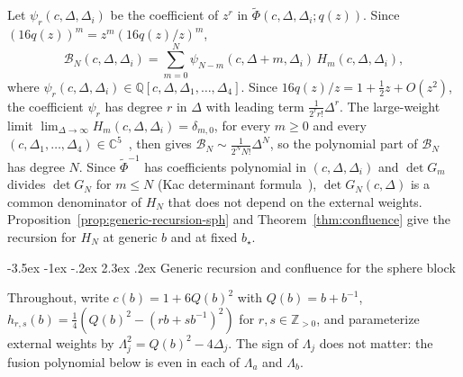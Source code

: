 \documentclass[twoside,10pt]{article}
\makeatletter
\numberwithin{equation}{section}
\theoremstyle{slbody}
\theoremstyle{definition}
\theoremstyle{remark}
\renewcommand{\section}{%
  \@startsection{section}{1}{\z@}%
    {-3.5ex \@plus -1ex \@minus -.2ex}%
    {2.3ex \@plus .2ex}%
    {\normalfont\large\bfseries}}
\makeatother
\begin{document}
Let \(\psi_r(c,\Delta,\Delta_i)\) be the coefficient of \(z^r\) in
\(\widetilde\Phi(c,\Delta,\Delta_i;q(z))\).  Since
\((16q(z))^m=z^m(16q(z)/z)^m\),
\begin{equation}\label{eq:B-from-H}
 \mathcal B_N(c,\Delta,\Delta_i)
 =\sum_{m=0}^N\psi_{N-m}(c,\Delta+m,\Delta_i)\,H_m(c,\Delta,\Delta_i),
\end{equation}
where \(\psi_r(c,\Delta,\Delta_i)\in\mathbb Q[c,\Delta,\Delta_1,\dots,\Delta_4]\).
Since \(16q(z)/z=1+\tfrac12 z+O(z^2)\), the coefficient \(\psi_r\) has degree
\(r\) in \(\Delta\) with leading term \(\frac{1}{2^r r!}\Delta^r\).
The large-weight limit
\(\lim_{\Delta\to\infty}H_m(c,\Delta,\Delta_i)=\delta_{m,0}\), for every
\(m\geq0\) and every \((c,\Delta_1,\dots,\Delta_4)\in\mathbb
C^5\)~\cite[Theorem~3.1]{PolzerLargeWeight2026}, then gives
\(\mathcal B_N\sim\frac{1}{2^N N!}\Delta^N\), so the polynomial part of
\(\mathcal B_N\) has degree \(N\).  Since \(\widetilde\Phi^{-1}\) has
coefficients polynomial in \((c,\Delta,\Delta_i)\) and \(\det G_m\) divides
\(\det G_N\) for \(m\leq N\) (Kac determinant formula~\cite[Theorem~4.2,
(4.16) and (4.21)]{IoharaKoga2011}), \(\det G_N(c,\Delta)\) is a common
denominator of \(H_N\) that does not depend on the external weights.
Proposition~\ref{prop:generic-recursion-sph} and Theorem~\ref{thm:confluence}
give the recursion for \(H_N\) at generic \(b\) and at fixed \(b_\star\).

\section{Generic recursion and confluence for the sphere block}\label{sec:confluence}

Throughout, write \(c(b)=1+6Q(b)^2\) with \(Q(b)=b+b^{-1}\),
\(h_{r,s}(b)=\frac14(Q(b)^2-(rb+sb^{-1})^2)\) for \(r,s\in\mathbb Z_{>0}\),
and parameterize external weights by \(\Lambda_j^2=Q(b)^2-4\Delta_j\).  The
sign of \(\Lambda_j\) does not matter: the fusion polynomial below is even in
each of \(\Lambda_a\) and \(\Lambda_b\).
\end{document}

